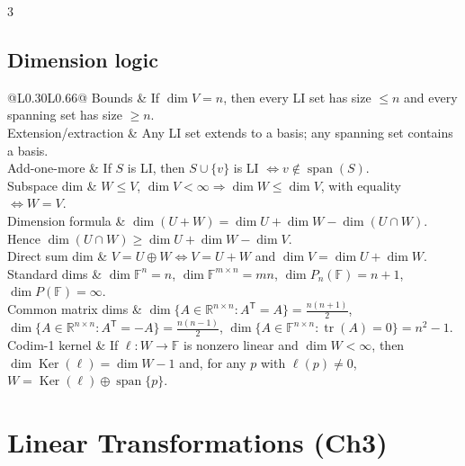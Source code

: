 \documentclass[10pt]{article}
\makeatletter
\newcommand{\R}{\mathbb{R}}
\newcommand{\F}{\mathbb{F}}
\newcommand{\Ker}{\operatorname{Ker}}
\newcommand{\spann}{\operatorname{span}}
\newcommand{\tr}{\operatorname{tr}}
\newcommand{\T}{^{\mathsf T}}
\newcommand{\cheattable}[1]{\begin{tabular}{@{}L{0.30\columnwidth}L{0.66\columnwidth}@{}}#1\end{tabular}}
\makeatother
\begin{document}
\begin{multicols}{3}
\subsection*{Dimension logic}
\cheattable{
Bounds & If $\dim V=n$, then every LI set has size $\le n$ and every spanning set has size $\ge n$.\\
Extension/extraction & Any LI set extends to a basis; any spanning set contains a basis.\\
Add-one-more & If $S$ is LI, then $S\cup\{v\}$ is LI $\iff v\notin\spann(S)$.\\
Subspace dim & $W\le V$, $\dim V<\infty \Rightarrow \dim W\le \dim V$, with equality $\iff W=V$.\\
Dimension formula & $\dim(U+W)=\dim U+\dim W-\dim(U\cap W)$. Hence $\dim(U\cap W)\ge \dim U+\dim W-\dim V$.\\
Direct sum dim & $V=U\oplus W \iff V=U+W$ and $\dim V=\dim U+\dim W$.\\
Standard dims & $\dim \F^n=n$, $\dim \F^{m\times n}=mn$, $\dim P_n(\F)=n+1$, $\dim P(\F)=\infty$.\\
Common matrix dims & $\dim\{A\in\R^{n\times n}:A\T=A\}=\frac{n(n+1)}2$, $\dim\{A\in\R^{n\times n}:A\T=-A\}=\frac{n(n-1)}2$, $\dim\{A\in\F^{n\times n}:\tr(A)=0\}=n^2-1$.\\
Codim-1 kernel & If $\ell:W\to\F$ is nonzero linear and $\dim W<\infty$, then $\dim\Ker(\ell)=\dim W-1$ and, for any $p$ with $\ell(p)\neq 0$, $W=\Ker(\ell)\oplus\spann\{p\}$.\\
}

\section*{Linear Transformations (Ch3)}


\end{multicols}
\end{document}
